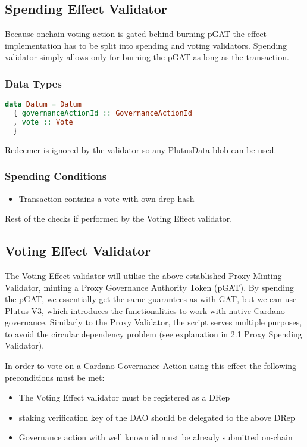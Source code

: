 \documentclass{article}
\begin{document}
\subsection{Spending Effect Validator}

Because onchain voting action is gated behind burning pGAT the effect implementation has to be split into spending and voting validators. Spending validator simply allows only for burning the pGAT as long as the transaction.

\subsubsection*{Data Types}

\begin{lstlisting}[language=Haskell]
data Datum = Datum
  { governanceActionId :: GovernanceActionId
  , vote :: Vote
  }
\end{lstlisting}

Redeemer is ignored by the validator so any PlutusData blob can be used.

\subsubsection*{Spending Conditions}

\begin{itemize}
  \item Transaction contains a vote with own drep hash
\end{itemize}

Rest  of the checks if performed by the Voting Effect validator.

\subsection{Voting Effect Validator}

The Voting Effect validator will utilise the above established Proxy Minting Validator, minting a Proxy Governance Authority Token (pGAT).
By spending the pGAT, we essentially get the same guarantees as with GAT, but we can use Plutus V3, which introduces the functionalities to work with native Cardano governance.
Similarly to the Proxy Validator, the script serves multiple purposes, to avoid the circular dependency problem (see explanation in 2.1 Proxy Spending Validator).

In order to vote on a Cardano Governance Action using this effect the following preconditions must be met:
\begin{itemize}
  \item The Voting Effect validator must be registered as a DRep
  \item staking verification key of the DAO should be delegated to the above DRep
  \item Governance action with well known id must be already submitted on-chain
\end{itemize}
\end{document}
